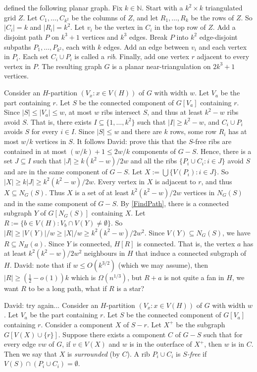 \documentclass{patmorin}
\renewcommand{\geq}{\geqslant}
\renewcommand{\leq}{\leqslant}
\newcommand{\david}[1]{{\color{orange} David: #1}}
\newcommand{\defin}[1]{\emph{\textcolor{brightmaroon}{#1}}}
\begin{document}
\citet{LMST08} defined the following planar graph. Fix $k\in\mathbb{N}$. Start with a $k^2 \times k$ triangulated grid $Z$. Let $C_1,\dots,C_{k^2}$ be the columns of $Z$, and let $R_1,\dots,R_k$ be the rows of $Z$. So $|C_i|=k$ and $|R_i|=k^2$. Let $v_i$ be the vertex in $C_i$ in the top row of $Z$. Add a disjoint path $P$ on $k^3+1$ vertices and $k^3$ edges. Break $P$ into $k^2$ edge-disjoint subpaths $P_1,\dots,P_{k^2}$, each with $k$ edges. Add an edge between $v_i$ and each vertex in $P_i$.
Each set $C_i\cup P_i$ is called a \defin{rib}. Finally, add one vertex $r$ adjacent to every vertex in $P$. The resulting graph $G$ is a planar near-triangulation on $2k^3+1$ vertices.

Consider an $H$-partition $(V_x:x\in V(H))$ of $G$ with width $w$. Let $V_a$ be the part containing $r$. Let $S$ be the connected component of $G[V_a]$ containing $r$. Since $|S|\leq |V_a|\leq w$, at most $w$ ribs intersect $S$, and thus at least $k^2-w$ ribs avoid $S$. That is, there exists $I\subseteq \{1,\dots,k^2\}$ such that $|I|\geq k^2-w$, and $C_i\cup P_i$ avoids $S$ for every $i\in I$. Since $|S|\leq w$ and there are $k$ rows, some row $R_i$ has at most $w/k$ vertices in $S$. It follows \david{prove this} that the $S$-free ribs are contained in at most $(w/k)+1 \leq 2w/k$ components of $G-S$. Hence, there is a set $J\subseteq I$ such that $|J|\geq k(k^2-w)/2w$ and all the ribs $\{P_i\cup C_i:i\in J\}$ avoid $S$ and are in the same component of $G-S$. Let $X:=\bigcup\{V(P_i):i\in J\}$. So $|X|\geq k|J|\geq k^2(k^2-w)/2w$. Every vertex in $X$ is adjacent to $r$, and thus $X\subseteq N_G(S)$. Thus $X$ is a set of at least $k^2(k^2-w)/2w$ vertices in $N_G(S)$ and in the same component of $G-S$. By \cref{FindPath}, there is a connected subgraph $Y$ of $G[N_G(S)]$ containing $X$. Let $R:=\{ b\in V(H): V_b\cap V(Y)\neq\emptyset\}$. So $|R|\geq |V(Y)|/w\geq |X|/w \geq k^2(k^2-w)/2w^2$. Since $V(Y)\subseteq N_G(S)$, we have $R\subseteq N_H(a)$. Since $Y$ is connected, $H[R]$ is connected. That is, the vertex $a$ has at least $k^2(k^2-w)/2w^2$ neighbours in $H$ that induce a connected subgraph of $H$.
\david{note that if $w\leq O(k^{3/2})$ (which we may assume), then $|R|\geq (\frac12 -o(1))k$ which is $\Omega(n^{1/3})$, but $R+a$ is not quite a fan in $H$, we want $R$ to be a long path, what if $R$ is a star? }

\david{try again...}
Consider an $H$-partition $(V_x:x\in V(H))$ of $G$ with width $w$. Let $V_a$ be the part containing $r$. Let $S$ be the connected component of $G[V_a]$ containing $r$.
Consider a component $X$ of $S-r$. Let $X^+$ be the subgraph $G[V(X)\cup\{r\}]$. Suppose there exists a component $C$ of $G-S$ such that for every edge $vw$ of $G$, if $v\in V(X)$ and $w$ is in the outerface of $X^+$, then $w$ is in $C$. Then we say that $X$ is \defin{surrounded} (by $C$). A rib $P_i\cup C_i$ is \defin{$S$-free} if $V(S)\cap (P_i\cup C_i)=\emptyset$.
\end{document}
